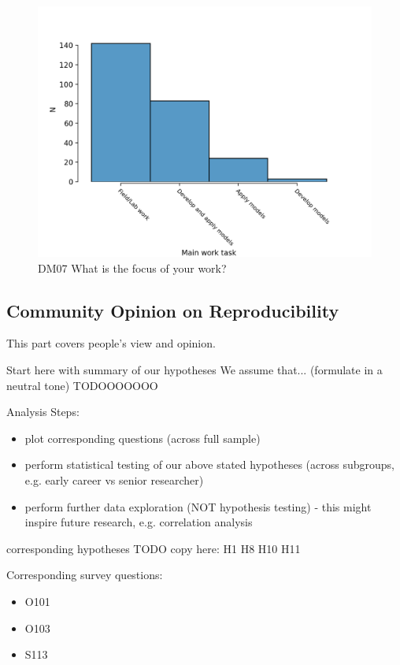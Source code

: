 \documentclass{article}
\begin{document}
\begin{figure}[h!]
    \centering
    \includegraphics[width=\textwidth]{../figs/DM07.png}
	\caption{DM07 What is the focus of your work?}
    \label{fig:dm07}
\end{figure}

\subsection{Community Opinion on Reproducibility}

This part covers people's view and opinion.

Start here with summary of our hypotheses We assume that... (formulate in a neutral tone) TODOOOOOOO

Analysis Steps:
\begin{itemize}
	\item plot corresponding questions (across full sample)
	\item perform statistical testing of our above stated hypotheses (across subgroups, e.g. early career vs senior researcher)
	\item perform further data exploration (NOT hypothesis testing) - this might inspire future research, e.g. correlation analysis
\end{itemize}

    corresponding hypotheses TODO copy here:
        H1
        H8
        H10
        H11


Corresponding survey questions:
\begin{itemize}
	\item O101
	\item O103
	\item S113
\end{itemize}
\end{document}
